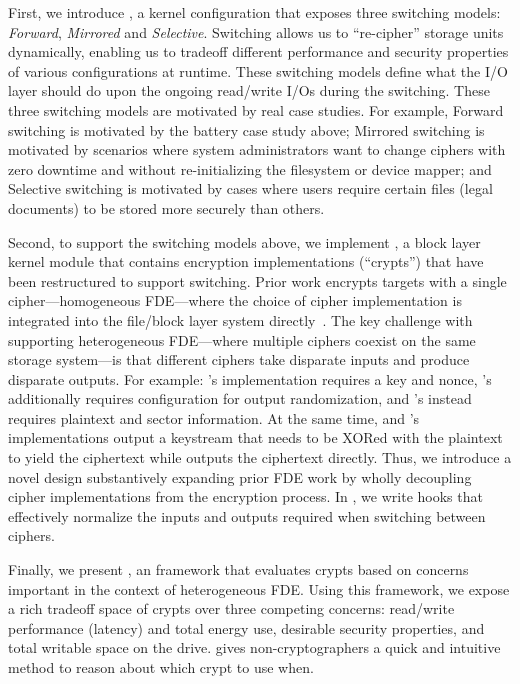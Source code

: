 First, we introduce \sysA, a kernel configuration that exposes three switching
models: {\em Forward}, {\em Mirrored} and {\em Selective}. Switching allows us
to ``re-cipher'' storage units dynamically, enabling us to tradeoff different
performance and security properties of various configurations at runtime. These
switching models define what the I/O layer should do upon the ongoing read/write
I/Os during the switching. These three switching models are motivated by real
case studies. For example, Forward switching is motivated by the battery case
study above; Mirrored switching is motivated by scenarios where system
administrators want to change ciphers with zero downtime and without
re-initializing the filesystem or device mapper; and Selective switching is
motivated by cases where users require certain files (\eg legal documents) to be
stored more securely than others.

Second, to support the switching models above, we implement \sysB, a block layer
kernel module that contains encryption implementations (``crypts'') that have
been restructured to support switching. Prior work encrypts targets with a
single cipher---\ie homogeneous FDE---where the choice of cipher implementation
is integrated into the file/block layer system directly~\cite{StrongBox,
dmcrypt}. The key challenge with supporting heterogeneous FDE---where multiple
ciphers coexist on the same storage system---is that different ciphers take
disparate inputs and produce disparate outputs. For example: \encB's
implementation requires a key and nonce, \encA's additionally requires
configuration for output randomization, and \encC's instead requires plaintext
and sector information. At the same time, \encA and \encB's implementations
output a keystream that needs to be XORed with the plaintext to yield the
ciphertext while \encC outputs the ciphertext directly. Thus, we introduce a
novel design substantively expanding prior FDE work by wholly decoupling cipher
implementations from the encryption process. In \sysB, we write hooks that
effectively normalize the inputs and outputs required when switching between
ciphers.

Finally, we present \sysC, an framework that evaluates crypts based on concerns
important in the context of heterogeneous FDE. Using this framework, we expose a
rich tradeoff space of crypts over three competing concerns: read/write
performance (latency) and total energy use, desirable security properties, and
total writable space on the drive. \sysC gives non-cryptographers a quick and
intuitive method to reason about which crypt to use when.

